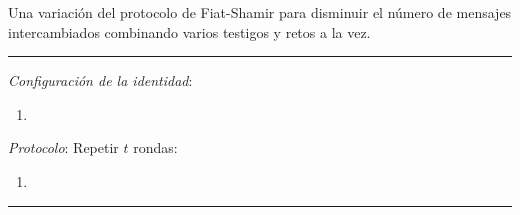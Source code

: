 Una variación del protocolo de Fiat-Shamir para disminuir el número de mensajes intercambiados combinando varios testigos y retos a la vez.

\rule{\textwidth}{1pt}
\begin{algorithm}
	\hfil
	
	\textit{Configuración de la identidad}:
	\begin{enumerate}
		\item 
		
	\end{enumerate}
	
	
	\textit{Protocolo}: Repetir $t$ rondas:
	\begin{enumerate}
		\item 
	\end{enumerate}
	
\end{algorithm}
\rule{\textwidth}{1pt}










%
%
%
%
%



